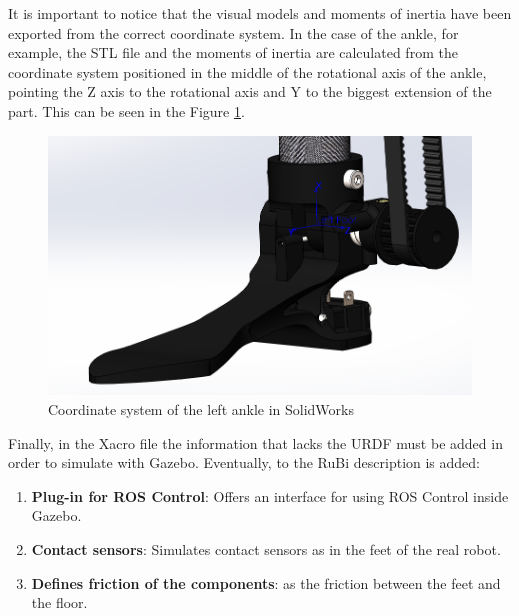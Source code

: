 It is important to notice that the visual models and moments of inertia have been exported from the correct coordinate system.
In the case of the ankle, for example, the STL file and the moments of inertia are calculated from the coordinate system positioned in the middle of the rotational axis of the ankle, pointing the Z axis to the rotational axis and Y to the biggest extension of the part.
This can be seen in the Figure \ref{fig:solidworks_ankle_coodinate_system}.

\begin{figure}[ht!]
  \centering
  \includegraphics[width=0.75\linewidth]{figures/solidworks_ankle_coordinate_system}
  \caption{Coordinate system of the left ankle in SolidWorks}
  \label{fig:solidworks_ankle_coodinate_system}
\end{figure}

Finally, in the Xacro file the information that lacks the URDF must be added in order to simulate with Gazebo.
Eventually, to the RuBi description is added:
\begin{enumerate}
  \item \textbf{Plug-in for ROS Control}: Offers an interface for using ROS Control inside Gazebo.
  \item \textbf{Contact sensors}: Simulates contact sensors as in the feet of the real robot.
  \item \textbf{Defines friction of the components}: as the friction between the feet and the floor.
\end{enumerate}

